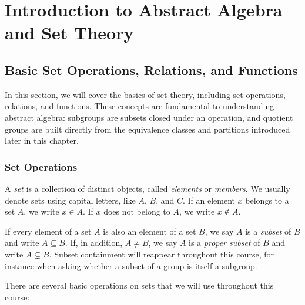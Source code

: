 
\chapter{Introduction to Abstract Algebra and Set Theory}

\section{Basic Set Operations, Relations, and Functions}

In this section, we will cover the basics of set theory, including set operations, relations, and functions. These concepts are fundamental to understanding abstract algebra: subgroups are subsets closed under an operation, and quotient groups are built directly from the equivalence classes and partitions introduced later in this chapter.

\subsection{Set Operations}

A \textit{set} is a collection of distinct objects, called \textit{elements} or \textit{members}. We usually denote sets using capital letters, like $A$, $B$, and $C$. If an element $x$ belongs to a set $A$, we write $x \in A$. If $x$ does not belong to $A$, we write $x \notin A$.

If every element of a set $A$ is also an element of a set $B$, we say $A$ is a \textit{subset} of $B$ and write $A \subseteq B$. If, in addition, $A \neq B$, we say $A$ is a \textit{proper subset} of $B$ and write $A \subsetneq B$. Subset containment will reappear throughout this course, for instance when asking whether a subset of a group is itself a subgroup.

There are several basic operations on sets that we will use throughout this course:

